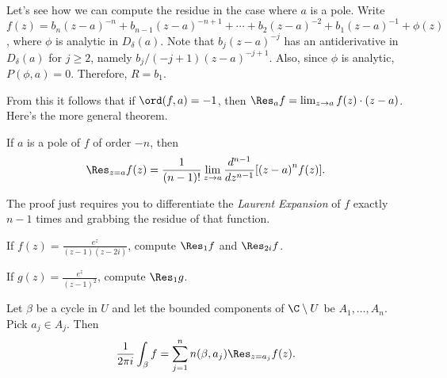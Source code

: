Let's see how we can compute the residue in the case where $a$ is a pole.
Write $f(z) = b_n{(z-a)}^{-n} + b_{n-1}{(z-a)}^{-n+1} + \cdots + b_2{(z-a)}^{-2}
+ b_1{(z-a)}^{-1} + \phi(z)$, where $\phi$ is analytic in $D_{\delta}(a)$.
Note that $b_j{(z-a)}^{-j}$ has an antiderivative in $D_{\delta}(a)$ for
$j \ge 2$, namely $b_j/(-j+1) {(z-a)}^{-j+1}$.
Also, since $\phi$ is analytic, $P(\phi, a) = 0$.
Therefore, $R = b_1$.

From this it follows that if $\ord(f, a) = -1$, then
$\Res_a f = \lim_{z \to a} f(z) \cdot (z-a)$.
Here's the more general theorem.
\begin{theorem}
    If $a$ is a pole of $f$ of order $-n$, then
    \[ \Res_{z=a} f(z) = \frac{1}{(n-1)!} \lim_{z \to a} \frac{d^{n-1}}{dz^{n-1}} [{(z-a)}^n f(z)]. \]
\end{theorem}
The proof just requires you to differentiate the \textit{Laurent Expansion}
of $f$ exactly $n-1$ times and grabbing the residue of that function.

\begin{exercise*}
    If $f(z) = \frac{e^z}{(z-1)(z-2i)}$, compute $\Res_1 f$ and $\Res_{2i} f$.
\end{exercise*}

\begin{exercise*}
    If $g(z) = \frac{e^z}{{(z-1)}^2}$, compute $\Res_1 g$.
\end{exercise*}

\begin{theorem}
    Let $\beta$ be a cycle in $U$ and let the bounded components
    of $\C \setminus U$ be $A_1, \ldots, A_n$. 
    Pick $a_j \in A_j$.
    Then
    \[ \frac{1}{2\pi i} \int_{\beta} f = \sum_{j=1}^{n} n(\beta, a_j)
    \Res_{z=a_j} f(z). \]
\end{theorem}

